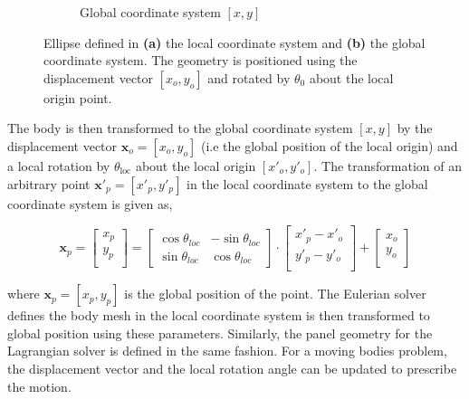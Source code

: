 \begin{figure}[h]
\begin{subfigure}[t]{0.45\textwidth}
             \caption{Global coordinate system $[x,y]$}
             \label{fig:globalPosition2}
     \end{subfigure}

     \caption{Ellipse defined in \textbf{(a)} the local coordinate system and \textbf{(b)} the global coordinate system. The geometry is positioned using the displacement vector $[x_o,y_o]$ and rotated by $\theta_0$ about the local origin point.}
     \label{fig:positionOfBody2}
	\end{figure}
	
The body is then transformed to the global coordinate system $[x,y]$ by the displacement vector $\mathbf{x}_o = [x_o,y_o]$ (i.e the global position of the local origin) and a local rotation by $\theta_{\mathrm{loc}}$ about the local origin $[x'_o,y'_o]$. The transformation of an arbitrary point $\mathbf{x}'_p = [x'_p,y'_p]$ in the local coordinate system to the global coordinate system is given as,

		\begin{equation}
		\mathbf{x}_p = 
		\begin{bmatrix}
		{x}_p\\
		{y}_p\\
		\end{bmatrix} = \begin{bmatrix}
		\cos\theta_{loc} & -\sin\theta_{loc}  \\
		\sin\theta_{loc}  & \cos\theta_{loc} 
		\end{bmatrix} \cdot \begin{bmatrix}
		x'_p-x'_o\\
		y'_p-y'_o\\
		\end{bmatrix} + 
		\begin{bmatrix}
		{x_{o}}\\
		{y_{o}}\\
		\end{bmatrix} 
		\end{equation}

where $\mathbf{x}_p = [x_p,y_p]$ is the global position of the point. The Eulerian solver defines the body mesh in the local coordinate system is then transformed to global position using these parameters. Similarly, the panel geometry for the Lagrangian solver is defined in the same fashion. For a moving bodies problem, the displacement vector and the local rotation angle can be updated to prescribe the motion.



